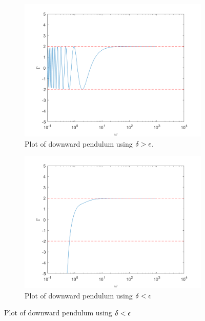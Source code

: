 \documentclass[12pt]{report}
\begin{document}
\begin{solution}
\begin{enumerate}
\begin{figure}[H]
\begin{subfigure}[b]{0.5\linewidth}
                \includegraphics[width=\linewidth]{images/nld1.png}
                \caption{Plot of downward pendulum using $\delta > {\epsilon}$.}
                \label{fig3:a}
                \vspace{4ex}
            \end{subfigure}%
            \begin{subfigure}[b]{0.5\linewidth}
                \centering
                \includegraphics[width=\linewidth]{images/nld2.png}
                \caption{Plot of downward pendulum using $\delta < {\epsilon}$}
                \label{fig3:b}
                \vspace{4ex}
            \end{subfigure}

\end{figure}
\end{enumerate}
\end{solution}
\end{document}
